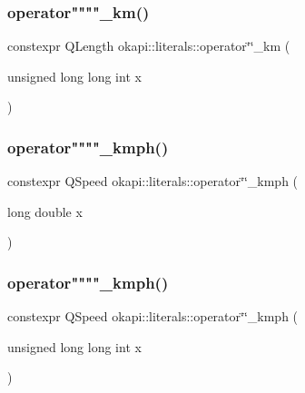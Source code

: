 \mbox{\label{namespaceokapi_1_1literals_a820d5a94f0ca54b6f65ca1191801fae0}} 
\subsubsection{\texorpdfstring{operator""""\_km()}{operator""\_km()}\hspace{0.1cm}{\footnotesize\ttfamily [2/2]}}
{\footnotesize\ttfamily constexpr Q\+Length okapi\+::literals\+::operator\char`\"{}\char`\"{}\+\_\+km (\begin{DoxyParamCaption}\item[{unsigned long long int}]{x }\end{DoxyParamCaption})}

\mbox{\label{namespaceokapi_1_1literals_a811760fb986149d719b1f0f37d2bff7c}} 
\subsubsection{\texorpdfstring{operator""""\_kmph()}{operator""\_kmph()}\hspace{0.1cm}{\footnotesize\ttfamily [1/2]}}
{\footnotesize\ttfamily constexpr Q\+Speed okapi\+::literals\+::operator\char`\"{}\char`\"{}\+\_\+kmph (\begin{DoxyParamCaption}\item[{long double}]{x }\end{DoxyParamCaption})}

\mbox{\label{namespaceokapi_1_1literals_a34b7a7d505d70d3fddf30234078a3631}} 
\subsubsection{\texorpdfstring{operator""""\_kmph()}{operator""\_kmph()}\hspace{0.1cm}{\footnotesize\ttfamily [2/2]}}
{\footnotesize\ttfamily constexpr Q\+Speed okapi\+::literals\+::operator\char`\"{}\char`\"{}\+\_\+kmph (\begin{DoxyParamCaption}\item[{unsigned long long int}]{x }\end{DoxyParamCaption})}

